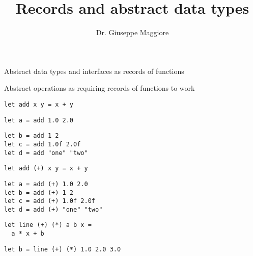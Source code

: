 \documentclass{beamer}
\title{Records and abstract data types}
\author{Dr. Giuseppe Maggiore}
\institute{Hogeschool Rotterdam \\ 
Rotterdam, Netherlands}
\date{}
\begin{document}
\maketitle

\begin{slide}{
\item Abstract data types and interfaces as records of functions
\item Abstract operations as requiring records of functions to work
}\end{slide}

\begin{frame}[fragile]
\begin{lstlisting}
let add x y = x + y
\end{lstlisting}
\end{frame}

\begin{frame}[fragile]
\begin{lstlisting}
let a = add 1.0 2.0
\end{lstlisting}
\end{frame}

\begin{frame}[fragile]
\begin{lstlisting}
let b = add 1 2
let c = add 1.0f 2.0f
let d = add "one" "two"
\end{lstlisting}
\end{frame}

\begin{frame}[fragile]
\begin{lstlisting}
let add (+) x y = x + y
\end{lstlisting}
\end{frame}

\begin{frame}[fragile]
\begin{lstlisting}
let a = add (+) 1.0 2.0
let b = add (+) 1 2
let c = add (+) 1.0f 2.0f
let d = add (+) "one" "two"
\end{lstlisting}
\end{frame}

\begin{frame}[fragile]
\begin{lstlisting}
let line (+) (*) a b x =
  a * x + b
\end{lstlisting}
\end{frame}

\begin{frame}[fragile]
\begin{lstlisting}
let b = line (+) (*) 1.0 2.0 3.0
\end{lstlisting}
\end{frame}
\end{document}
